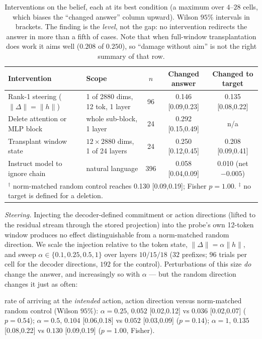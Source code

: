 \documentclass{article}
\begin{document}
\begin{table}[t]
  \centering
  \small
  \caption{Interventions on the belief, each at its best condition (a maximum over
  $4$--$28$ cells, which biases the ``changed answer'' column upward). Wilson $95\%$
  intervals in brackets. The finding is the \emph{level}, not the gap: no intervention
  redirects the answer in more than a fifth of cases. Note that when full-window
  transplantation does work it aims well ($0.208$ of $0.250$), so ``damage without aim'' is
  not the right summary of that row.}
  \label{tab:interventions}
  \begin{tabular}{llccc}
    \toprule
    Intervention & Scope & $n$ & Changed answer & Changed to target \\
    \midrule
    Rank-1 steering ($\|\Delta\|{=}\|h\|$) & 1 of 2880 dims, 12 tok, 1 layer & 96 & 0.146 [0.09,0.23] & 0.135 [0.08,0.22]\rlap{$^\dagger$} \\
    Delete attention or MLP block   & whole sub-block, 1 layer & 24 & 0.292 [0.15,0.49] & n/a\rlap{$^\ddagger$} \\
    Transplant window state         & $12\times2880$ dims, 1 of 24 layers & 24 & 0.250 [0.12,0.45] & 0.208 [0.09,0.41] \\
    Instruct model to ignore chain  & natural language & 396 & 0.058 [0.04,0.09] & 0.010 (net $-0.005$) \\
    \bottomrule
    \multicolumn{5}{l}{\footnotesize $^\dagger$ norm-matched random control reaches 0.130 [0.09,0.19]; Fisher $p=1.00$. $^\ddagger$ no target is defined for a deletion.}
  \end{tabular}
\end{table}

\emph{Steering.} Injecting the decoder-defined commitment or action directions (lifted to
the residual stream through the stored projection) into the probe's own 12-token window
produces no effect distinguishable from a norm-matched random direction. We scale the
injection relative to the token state, $\|\Delta\| = \alpha\|h\|$, and sweep
$\alpha \in \{0.1, 0.25, 0.5, 1\}$ over layers $10/15/18$ ($32$ prefixes; $96$ trials per
cell for the decoder directions, $192$ for the control). Perturbations of this size
\emph{do} change the answer, and increasingly so with $\alpha$ --- but the random direction
changes it just as often:

rate of arriving at the \emph{intended} action, action direction versus norm-matched
random control (Wilson $95\%$): $\alpha=0.25$, $0.052$ [0.02,0.12] vs $0.036$ [0.02,0.07]
($p=0.54$); $\alpha=0.5$, $0.104$ [0.06,0.18] vs $0.052$ [0.03,0.09] ($p=0.14$);
$\alpha=1$, $0.135$ [0.08,0.22] vs $0.130$ [0.09,0.19] ($p=1.00$, Fisher).
\end{document}
